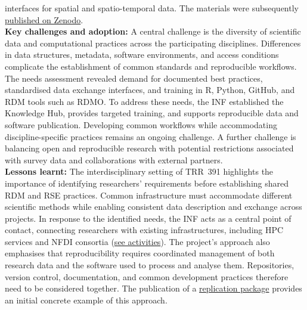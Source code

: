 \documentclass{eceasst}
\begin{document}
interfaces for spatial and spatio-temporal data.
The materials were subsequently
\href{https://doi.org/10.5281/zenodo.17405120}
{published on Zenodo}.
\\
\noindent\textbf{Key challenges and adoption:}
A central challenge is the diversity of scientific
data and computational practices across the participating
disciplines. Differences in data structures, metadata,
software environments, and access conditions complicate
the establishment of common standards and reproducible
workflows.
The needs assessment revealed demand for
documented best practices, standardised data
exchange interfaces, and training in R, Python,
GitHub, and RDM tools such as RDMO.
To address these needs, the INF established
the Knowledge Hub, provides targeted training,
and supports reproducible data and software
publication.
Developing common workflows while
accommodating discipline-specific practices remains
an ongoing challenge.
A further challenge is balancing open and reproducible
research with potential restrictions associated with
survey data and collaborations with external partners.
\\
\noindent\textbf{Lessons learnt:}
The interdisciplinary setting of TRR~391 highlights
the importance of identifying researchers' requirements
before establishing shared RDM and RSE practices.
Common infrastructure must accommodate different
scientific methods while enabling consistent data
description and exchange across projects.
In response to the identified needs, the INF acts as
a central point of contact, connecting researchers
with existing infrastructures, including HPC services and NFDI consortia
(\href{https://doi.org/10.5281/zenodo.17719642}
{see activities}).
The project's approach also emphasises that
reproducibility requires coordinated management of
both research data and the software used to process
and analyse them. Repositories, version control,
documentation, and common development practices
therefore need to be considered together.
The publication of a
\href{https://doi.org/10.17877/TRR391-2026-MW1W38NU}
{replication package}
provides an initial concrete example of this approach.
\end{document}
